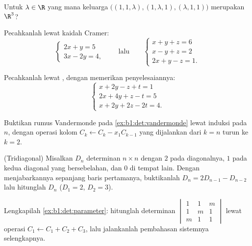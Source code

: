 \begin{exercise}[$\star$]\label{exo:b1:det:2}
Untuk $\lambda \in \R$ yang mana keluarga $\bigl((1, 1, \lambda),
(1, \lambda, 1), (\lambda, 1, 1)\bigr)$ merupakan  $\R^3$?
\end{exercise}

\begin{exercise}[$\star$]\label{exo:b1:det:3}
Pecahkanlah lewat kaidah Cramer:
\[
\begin{cases}
2x + y = 5\\
3x - 2y = 4 ,
\end{cases}
\qquad\text{lalu}\qquad
\begin{cases}
x + y + z = 6\\
x - y + z = 2\\
2x + y - z = 1 .
\end{cases}
\]
\end{exercise}

\begin{exercise}[$\star$]\label{exo:b1:det:4}
Pecahkanlah lewat , dengan memerikan  penyelesaiannya:
\[
\begin{cases}
x + 2y - z + t = 1\\
2x + 4y + z - t = 5\\
x + 2y + 2z - 2t = 4 .
\end{cases}
\]
\end{exercise}

\begin{exercise}[$\star\star$]\label{exo:b1:det:5}
Buktikan rumus Vandermonde pada \cref{ex:b1:det:vandermonde} lewat
induksi pada $n$, dengan operasi kolom $C_k \leftarrow C_k -
x_1 C_{k-1}$ yang dijalankan dari $k = n$ turun ke $k = 2$.
\end{exercise}

\begin{exercise}[$\star\star$]\label{exo:b1:det:6}
(Tridiagonal) Misalkan $D_n$ determinan $n \times n$ dengan $2$ pada
diagonalnya, $1$ pada kedua diagonal yang bersebelahan, dan $0$ di tempat lain.
Dengan menjabarkannya sepanjang baris pertamanya, buktikanlah $D_n = 2D_{n-1} - D_{n-2}$ lalu
hitunglah $D_n$ ($D_1 = 2$, $D_2 = 3$).
\end{exercise}

\begin{exercise}[$\star\star$]\label{exo:b1:det:7}
Lengkapilah \cref{ex:b1:det:parameter}: hitunglah determinan
$\begin{vmatrix} 1 & 1 & m\\ 1 & m & 1\\ m & 1 & 1\end{vmatrix}$
lewat operasi $C_1 \leftarrow C_1 + C_2 + C_3$, lalu jalankanlah
pembahasan sistemnya selengkapnya.
\end{exercise}

